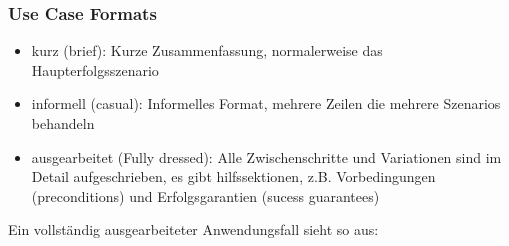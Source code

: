 \documentclass[
    ngerman,
    color=3b,
    summary,
    boxarc,
    main,
]{rubos-tuda-template}
\begin{document}
\subsubsection{Use Case Formats}
\begin{itemize}
    \item kurz (brief): Kurze Zusammenfassung, normalerweise das Haupterfolgsszenario
    \item informell (casual): Informelles Format, mehrere Zeilen die mehrere Szenarios behandeln
    \item ausgearbeitet (Fully dressed): Alle Zwischenschritte und Variationen sind im Detail aufgeschrieben, es gibt hilfssektionen, z.B. Vorbedingungen (preconditions) und Erfolgsgarantien (sucess guarantees)
\end{itemize}
Ein vollständig ausgearbeiteter Anwendungsfall sieht so aus:
\end{document}
